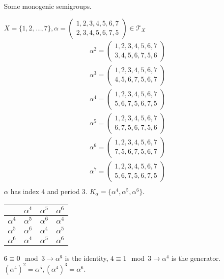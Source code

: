 \begin{Exap}Some monogenic semigroups.
    
    $X=\{1,2,...,7\},\alpha = (\begin{matrix}
        1,2,3,4,5,6,7   \\
        2,3,4,5,6,7,5
    \end{matrix}) \in \mathcal{T}_X$
    \begin{align*}
        \alpha^2=(\begin{matrix}
            1,2,3,4,5,6,7   \\
            3,4,5,6,7,5,6
        \end{matrix})   \\
        \alpha^3=(\begin{matrix}
            1,2,3,4,5,6,7   \\
            4,5,6,7,5,6,7
        \end{matrix})   \\
        \alpha^4=(\begin{matrix}
            1,2,3,4,5,6,7   \\
            5,6,7,5,6,7,5
        \end{matrix})   \\
        \alpha^5=(\begin{matrix}
            1,2,3,4,5,6,7   \\
            6,7,5,6,7,5,6
        \end{matrix})   \\
        \alpha^6=(\begin{matrix}
            1,2,3,4,5,6,7   \\
            7,5,6,7,5,6,7
        \end{matrix})   \\
        \alpha^7=(\begin{matrix}
            1,2,3,4,5,6,7   \\
            5,6,7,5,6,7,5
        \end{matrix})   \\
    \end{align*}
    $\alpha$ has index 4 and period 3. $K_\alpha = \{\alpha^4, \alpha^5, \alpha^6\}$.
    \begin{center}
        \begin{tabular}{c|ccc}
                       & $\alpha^4$ & $\alpha^5$ & $\alpha^6$ \\   \hline
            $\alpha^4$ & $\alpha^5$ & $\alpha^6$ & $\alpha^4$ \\  
            $\alpha^5$ & $\alpha^6$ & $\alpha^4$ & $\alpha^5$ \\
            $\alpha^6$ & $\alpha^4$ & $\alpha^5$ & $\alpha^6$ \\
        \end{tabular}
    \end{center}
    $6\equiv 0 \mod{3} \rightarrow \alpha^6$ is the identity, $4\equiv 1\mod{3}\rightarrow \alpha^4$ is the generator. $(\alpha^4)^2=\alpha^5, (\alpha^4)^3=\alpha^6$.
\end{Exap}

